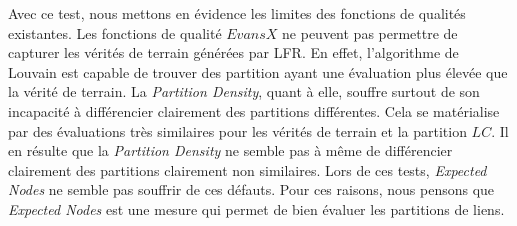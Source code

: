 Avec ce test, nous mettons en évidence les limites des fonctions de qualités existantes.
Les fonctions de qualité $EvansX$ ne peuvent pas permettre de capturer les vérités de terrain générées par LFR.
En effet, l'algorithme de Louvain est capable de trouver des partition ayant une évaluation plus élevée que la vérité de terrain.
La \emph{Partition Density}, quant à elle, souffre surtout de son incapacité à différencier clairement des partitions différentes.
Cela se matérialise par des évaluations très similaires pour les vérités de terrain et la partition $LC$.
Il en résulte que la \emph{Partition Density} ne semble pas à même de différencier clairement des partitions  clairement non similaires.
Lors de ces tests, \emph{Expected Nodes} ne semble pas souffrir de ces défauts.
Pour ces raisons, nous pensons que \emph{Expected Nodes} est une mesure qui permet de bien évaluer les partitions de liens.

